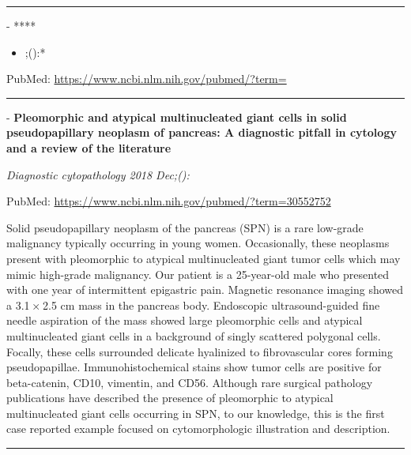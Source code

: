 \documentclass[]{article}
\providecommand{\tightlist}{%
  \setlength{\itemsep}{0pt}\setlength{\parskip}{0pt}}
\begin{document}
{}

{}

\begin{center}\rule{0.5\linewidth}{\linethickness}\end{center}

 - ****

\begin{itemize}
\tightlist
\item
  ;():*
\end{itemize}

PubMed: \url{https://www.ncbi.nlm.nih.gov/pubmed/?term=}

{}

{}

\begin{center}\rule{0.5\linewidth}{\linethickness}\end{center}

 - \textbf{Pleomorphic and atypical multinucleated giant cells in solid
pseudopapillary neoplasm of pancreas: A diagnostic pitfall in cytology
and a review of the literature}

\emph{Diagnostic cytopathology 2018 Dec;():}

PubMed: \url{https://www.ncbi.nlm.nih.gov/pubmed/?term=30552752}

Solid pseudopapillary neoplasm of the pancreas (SPN) is a rare low-grade
malignancy typically occurring in young women. Occasionally, these
neoplasms present with pleomorphic to atypical multinucleated giant
tumor cells which may mimic high-grade malignancy. Our patient is a
25-year-old male who presented with one year of intermittent epigastric
pain. Magnetic resonance imaging showed a 3.1 × 2.5 cm mass in the
pancreas body. Endoscopic ultrasound-guided fine needle aspiration of
the mass showed large pleomorphic cells and atypical multinucleated
giant cells in a background of singly scattered polygonal cells.
Focally, these cells surrounded delicate hyalinized to fibrovascular
cores forming pseudopapillae. Immunohistochemical stains show tumor
cells are positive for beta-catenin, CD10, vimentin, and CD56. Although
rare surgical pathology publications have described the presence of
pleomorphic to atypical multinucleated giant cells occurring in SPN, to
our knowledge, this is the first case reported example focused on
cytomorphologic illustration and description.

{}

{}

\begin{center}\rule{0.5\linewidth}{\linethickness}\end{center}
\end{document}
